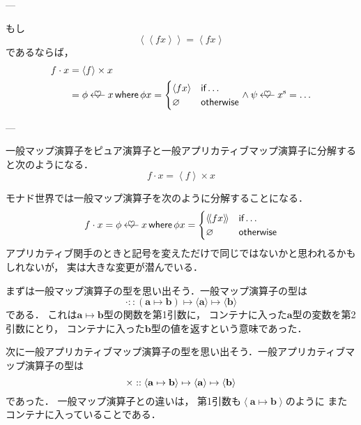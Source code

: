 \documentclass[a4paper,draft]{jsbook}
\newcommand{\mList}[1]{{#1}^\mathrm{s}}
\newcommand{\mathTypeParameter}[1]{\mathbf{#1}}
\newcommand{\mathPureWith}[1]{\left\langle#1\right\rangle}
\newcommand{\mathUnitWith}[1]{\left\langle\!\left\langle#1\right\rangle\!\right\rangle}
\newcommand{\mathPureNothing}{\varnothing}
\newcommand{\mathAnd}{\mathbin{\wedge}}
\newcommand{\mathApplicativeGeneralMap}{\mathbin{\times}}
\newcommand{\mathBind}{\mathbin{\ooalign{$\longleftarrow$\crcr\hss$\heartsuit$\hss}}}
\newcommand{\mathGeneralMap}{\mathbin{\cdot}}
\newcommand{\mathIn}{\mathrel{::}}
\newcommand{\mathMapsTo}{\mapsto}
\newcommand{\mathKeyword}[1]{\operatorname{\textsf{#1}}}
\newcommand{\mathIf}{\mathKeyword{if}}
\newcommand{\mathOtherwise}{\mathKeyword{otherwise}}
\newcommand{\mathWhere}{\mathKeyword{where}}
\newcommand{\mathMorph}[2]{#1\mathMapsTo#2}
\newcommand{\mathMorphII}[3]{#1\mathMapsTo#2\mathMapsTo#3}
\begin{document}
---

もし
\begin{equation}
\mathUnitWith{fx}=\mathPureWith{fx}
\end{equation}
であるならば，
\begin{align}
f\mathGeneralMap x&=\mathPureWith{f}\mathApplicativeGeneralMap x\\
&=\phi\mathBind x\mathWhere \phi x=\begin{cases}
\mathPureWith{fx}&\mathIf\dots\\
\mathPureNothing&\mathOtherwise
\end{cases}
\mathAnd
\psi\mathBind\mList{x}=\dots
\end{align}


---

一般マップ演算子をピュア演算子と一般アプリカティブマップ演算子に分解すると次のようになる．
\begin{equation}
f\mathGeneralMap x=\mathPureWith{f}\mathApplicativeGeneralMap x
\end{equation}

モナド世界では一般マップ演算子を次のように分解することになる．
\begin{equation}
f\mathGeneralMap x=\phi\mathBind x
\mathWhere
\phi x=\begin{cases}
\mathUnitWith{fx}&\mathIf\dots\\
\mathPureNothing&\mathOtherwise
\end{cases}
\end{equation}
アプリカティブ関手のときと記号を変えただけで同じではないかと思われるかもしれないが，
実は大きな変更が潜んでいる．

まずは一般マップ演算子の型を思い出そう．一般マップ演算子の型は
\begin{equation}
\mathGeneralMap
\mathIn{}\mathMorphII{(\mathMorph{\mathTypeParameter{a}}{\mathTypeParameter{b}})}{\langle\mathTypeParameter{a}\rangle}{\langle\mathTypeParameter{b}\rangle}
\end{equation}
である．
これは$\mathTypeParameter{a}\mapsto\mathTypeParameter{b}$型の関数を第1引数に，
コンテナに入った$\mathTypeParameter{a}$型の変数を第2引数にとり，
コンテナに入った$\mathTypeParameter{b}$型の値を返すという意味であった．

次に一般アプリカティブマップ演算子の型を思い出そう．一般アプリカティブマップ演算子の型は
\begin{equation}
\mathApplicativeGeneralMap
\mathIn{}\mathMorphII{\langle\mathMorph{\mathTypeParameter{a}}{\mathTypeParameter{b}}\rangle}{\langle\mathTypeParameter{a}\rangle}{\langle\mathTypeParameter{b}\rangle}\\
\end{equation}
であった．
一般マップ演算子との違いは，
第1引数も$\mathPureWith{\mathTypeParameter{a}\mapsto\mathTypeParameter{b}}$のように
またコンテナに入っていることである．
\end{document}
